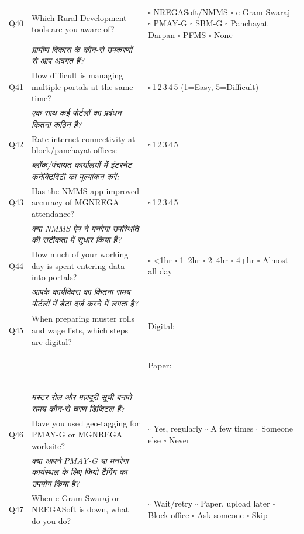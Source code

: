 \documentclass[10pt,a4paper]{article}
\newcommand{\likert}{{\Large$\square$}\,1\quad{\Large$\square$}\,2\quad{\Large$\square$}\,3\quad{\Large$\square$}\,4\quad{\Large$\square$}\,5}
\begin{document}
\noindent\begin{tabularx}{\textwidth}{@{}L{0.8cm} X L{5.2cm}@{}}
Q40 & Which Rural Development tools are you aware of? & {\Large$\square$} NREGASoft/NMMS {\Large$\square$} e-Gram Swaraj {\Large$\square$} PMAY-G {\Large$\square$} SBM-G {\Large$\square$} Panchayat Darpan {\Large$\square$} PFMS {\Large$\square$} None \\
 & {\hindifont\small\itshape\color{black!70} ग्रामीण विकास के कौन-से उपकरणों से आप अवगत हैं?} & \\[3pt]
Q41 & How difficult is managing multiple portals at the same time? & \likert{} {\scriptsize(1=Easy, 5=Difficult)} \\
 & {\hindifont\small\itshape\color{black!70} एक साथ कई पोर्टलों का प्रबंधन कितना कठिन है?} & \\[3pt]
Q42 & Rate internet connectivity at block/panchayat offices: & \likert \\
 & {\hindifont\small\itshape\color{black!70} ब्लॉक/पंचायत कार्यालयों में इंटरनेट कनेक्टिविटी का मूल्यांकन करें:} & \\[3pt]
Q43 & Has the NMMS app improved accuracy of MGNREGA attendance? & \likert \\
 & {\hindifont\small\itshape\color{black!70} क्या NMMS ऐप ने मनरेगा उपस्थिति की सटीकता में सुधार किया है?} & \\[3pt]
Q44 & How much of your working day is spent entering data into portals? & {\Large$\square$} <1hr {\Large$\square$} 1--2hr {\Large$\square$} 2--4hr {\Large$\square$} 4+hr {\Large$\square$} Almost all day \\
 & {\hindifont\small\itshape\color{black!70} आपके कार्यदिवस का कितना समय पोर्टलों में डेटा दर्ज करने में लगता है?} & \\[3pt]
Q45 & When preparing muster rolls and wage lists, which steps are digital? & Digital: \rule{5cm}{0.4pt}\\[2pt] && Paper: \rule{5cm}{0.4pt} \\
 & {\hindifont\small\itshape\color{black!70} मस्टर रोल और मज़दूरी सूची बनाते समय कौन-से चरण डिजिटल हैं?} & \\[3pt]
Q46 & Have you used geo-tagging for PMAY-G or MGNREGA worksite? & {\Large$\square$} Yes, regularly {\Large$\square$} A few times {\Large$\square$} Someone else {\Large$\square$} Never \\
 & {\hindifont\small\itshape\color{black!70} क्या आपने PMAY-G या मनरेगा कार्यस्थल के लिए जियो-टैगिंग का उपयोग किया है?} & \\[3pt]
Q47 & When e-Gram Swaraj or NREGASoft is down, what do you do? & {\Large$\square$} Wait/retry {\Large$\square$} Paper, upload later {\Large$\square$} Block office {\Large$\square$} Ask someone {\Large$\square$} Skip \\

\end{tabularx}
\end{document}
